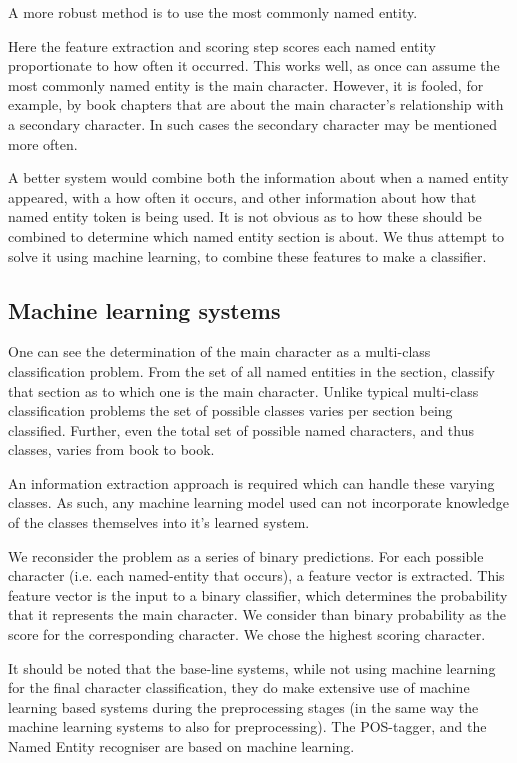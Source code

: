 \documentclass[11pt,a4paper]{article}
\begin{document}
A more robust method is to use the most commonly named entity.

Here the feature extraction and scoring step scores each named entity proportionate to how often it occurred.
This works well, as once can assume the most commonly named entity is the main character.
However, it is fooled, for example, by book chapters that are about the main character's relationship with a secondary character.
In such cases the secondary character may be mentioned more often.

A better system would combine both the information about when a named entity appeared,
with a how often it occurs, and other information about how that named entity token is being used.
It is not obvious as to how these should be combined to determine which named entity section is about.
We thus attempt to solve it using machine learning, to combine these features to make a classifier.

\subsection{Machine learning systems}
One can see the determination of the main character as a multi-class classification problem.
From the set of all named entities in the section, classify that section as to which one is the main character.
Unlike typical multi-class classification problems
the set of possible classes varies per section being classified.
Further, even the total set of possible named characters, and thus classes, varies from book to book.

An information extraction approach is required which can handle these varying classes.
As such, any machine learning model used can not incorporate knowledge of the classes themselves into it's learned system.

We reconsider the problem as a series of binary predictions.
For each possible character (i.e. each named-entity that occurs), a feature vector is extracted.
This feature vector is the input to a binary classifier, which determines the probability that it represents the main character.
We consider than binary probability as the score for the corresponding character.
We chose the highest scoring character.

It should be noted that the base-line systems, while not using machine learning for the final character classification, they do make extensive use of machine learning based systems during the preprocessing stages (in the same way the machine learning systems to also for preprocessing).
The POS-tagger, and the Named Entity recogniser are based on machine learning.
\end{document}
